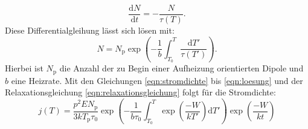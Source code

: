 \begin{equation}
  \frac{\mathrm{d}N}{\mathrm{d}t}=-\frac{N}{\tau(T)}\label{eqn:dgl}.
\end{equation}
Diese Differentialgleihung lässt sich lösen mit:
\begin{equation}
  N= N_\mathrm{p}\exp\left({-\frac{1}{b}\int_{T_\mathrm{0}}^{T} \frac{\mathrm{d}T'}{\tau(T')}}\right)\label{eqn:loesung}.
\end{equation}
Hierbei ist $N_\mathrm{p}$ die Anzahl der zu Begin einer Aufheizung orientierten Dipole und
$b$ eine Heizrate. Mit den Gleichungen \eqref{eqn:stromdichte} bis \eqref{eqn:loesung}
und der Relaxationsgleichung \eqref{eqn:relaxationsgleichung} folgt für die Stromdichte:
\begin{equation}
j(T)=\frac{p^2EN_\mathrm{p}}{3kT_\mathrm{p}\tau_{0}}\exp\left(-\frac{1}{b\tau_\mathrm{0}}\int_{T_\mathrm{0}}^{T}\exp\left(\frac{-W}{kT'}\right)\mathrm{d}T'\right)\exp\left(\frac{-W}{kt}\right) \label{eqn:8}
\end{equation}
